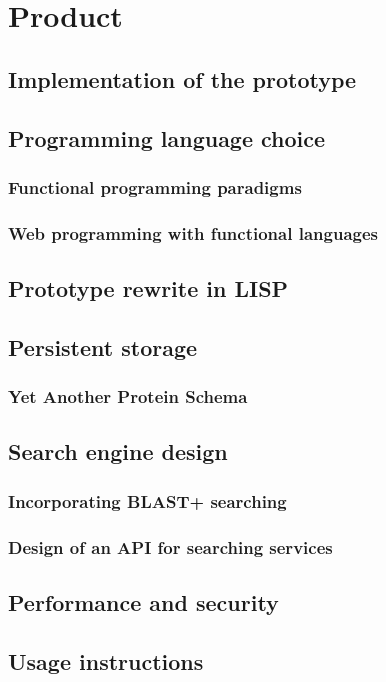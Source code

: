 \chapter{Product}\label{chap:product}

\section{Implementation of the prototype}

\section{Programming language choice}


\subsection{Functional programming paradigms}


\subsection{Web programming with functional languages}


\section{Prototype rewrite in LISP}

\section{Persistent storage}
\subsection{Yet Another Protein Schema}

\section{Search engine design}
\subsection{Incorporating BLAST+ searching}

\subsection{Design of an API for searching services}


\section{Performance and security}

\section{Usage instructions}
